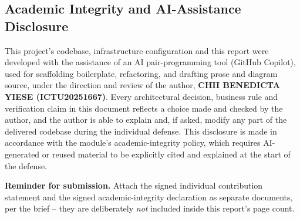 \subsection{Academic Integrity and AI-Assistance Disclosure}
This project's codebase, infrastructure configuration and this report were
developed with the assistance of an AI pair-programming tool (GitHub
Copilot), used for scaffolding boilerplate, refactoring, and drafting prose
and diagram source, under the direction and review of the author,
\textbf{CHII BENEDICTA YIESE (ICTU20251667)}. Every architectural decision,
business rule and verification claim in this document reflects a choice made
and checked by the author, and the author is able to explain and, if asked,
modify any part of the delivered codebase during the individual defense.
This disclosure is made in accordance with the module's academic-integrity
policy, which requires AI-generated or reused material to be explicitly
cited and explained at the start of the defense.

\begin{warnbox}
\textbf{Reminder for submission.} Attach the signed individual contribution
statement and the signed academic-integrity declaration as separate
documents, per the brief -- they are deliberately \emph{not} included inside
this report's page count.
\end{warnbox}
